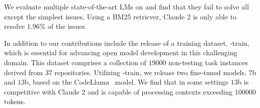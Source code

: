 We evaluate multiple state-of-the-art LMs on \benchmark{} and find that they fail to solve all except the simplest issues.
Using a BM25 retriever, Claude 2 is only able to resolve $1.96\%$ of the issues. 

In addition to \benchmark{} our contributions include the release of a training dataset, \benchmark{}-train, which is essential for advancing open model development in this challenging domain.
This dataset comprises a collection of $\num{19000}$ non-testing task instances derived from $37$ repositories.
Utilizing \benchmark{}-train, we release two fine-tuned models, \swellama{} $7$b and $13$b, based on the CodeLlama~\citep{rozière2023code} model.
We find that in some settings \swellama{} $13$b is competitive with Claude 2 and is capable of processing contexts exceeding $\num{100000}$ tokens.
